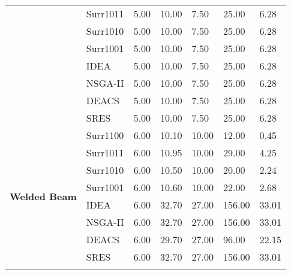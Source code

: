 \begin{table*}[!htb]
\begin{tabular}{lllllll}
		& Surr1011      & 5.00          & 10.00         & 7.50            & 25.00          & 6.28         \\ 
		& Surr1010      & 5.00          & 10.00         & 7.50            & 25.00          & 6.28         \\ 
		& Surr1001      & 5.00          & 10.00         & 7.50            & 25.00          & 6.28         \\  
		& IDEA          & 5.00          & 10.00         & 7.50            & 25.00          & 6.28         \\  
		& NSGA-II       & 5.00          & 10.00         & 7.50            & 25.00          & 6.28         \\ 
		& DEACS         & 5.00          & 10.00         & 7.50            & 25.00          & 6.28         \\ 
		& SRES          & 5.00          & 10.00         & 7.50            & 25.00          & 6.28         \\ \hline
		\multirow{8}{*}{\textbf{Welded Beam}}       & Surr1100      & 6.00          & 10.10         & 10.00           & 12.00          & 0.45         \\  
		& Surr1011      & 6.00          & 10.95         & 10.00           & 29.00          & 4.25         \\ 
		& Surr1010      & 6.00          & 10.50         & 10.00           & 20.00          & 2.24         \\ 
		& Surr1001      & 6.00          & 10.60         & 10.00           & 22.00          & 2.68         \\ 
		& IDEA          & 6.00          & 32.70         & 27.00           & 156.00         & 33.01        \\ 
		& NSGA-II       & 6.00          & 32.70         & 27.00           & 156.00         & 33.01        \\ 
		& DEACS         & 6.00          & 29.70         & 27.00           & 96.00          & 22.15        \\ 
		& SRES          & 6.00          & 32.70         & 27.00           & 156.00         & 33.01        \\ \specialrule{.2em}{.1em}{.1em} 
	\end{tabular}
\end{table*}
\clearpage

